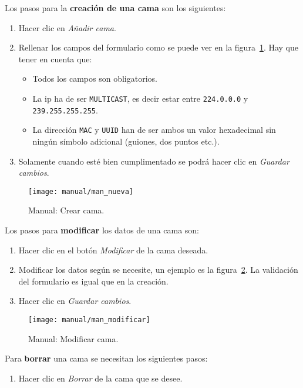 Los pasos para la \textbf{creación de una cama} son los siguientes:
\begin{enumerate}
	\item Hacer clic en \textit{Añadir cama}.
	\item Rellenar los campos del formulario como se puede ver en la figura~\ref{fig:man_new_bed}. Hay que tener en cuenta que:
	\begin{itemize}
		\item Todos los campos son obligatorios.
		\item La ip ha de ser \texttt{MULTICAST}, es decir estar entre \texttt{224.0.0.0} y \texttt{239.255.255.255}.
		\item La dirección \texttt{MAC} y \texttt{UUID} han de ser ambos un valor hexadecimal sin ningún símbolo adicional (guiones, dos puntos etc.).
	\end{itemize}
	\item Solamente cuando esté bien cumplimentado se podrá hacer clic en \textit{Guardar cambios}.
\end{enumerate}

\begin{figure}
	\centering
	\texttt{[image: manual/man\_nueva]}
	\caption{Manual: Crear cama.}
	\label{fig:man_new_bed}
\end{figure}

Los pasos para \textbf{modificar} los datos de una cama son:
\begin{enumerate}
	\item Hacer clic en el botón \textit{Modificar} de la cama deseada.
	\item Modificar los datos según se necesite, un ejemplo es la figura~\ref{fig:man_mod_bed}. La validación del formulario es igual que en la creación.
	\item Hacer clic en \textit{Guardar cambios}.
\end{enumerate}

\begin{figure}
	\centering
	\texttt{[image: manual/man\_modificar]}
	\caption{Manual: Modificar cama.}
	\label{fig:man_mod_bed}
\end{figure}

Para \textbf{borrar} una cama se necesitan los siguientes pasos:
\begin{enumerate}
	\item Hacer clic en \textit{Borrar} de la cama que se desee.
\end{enumerate}

